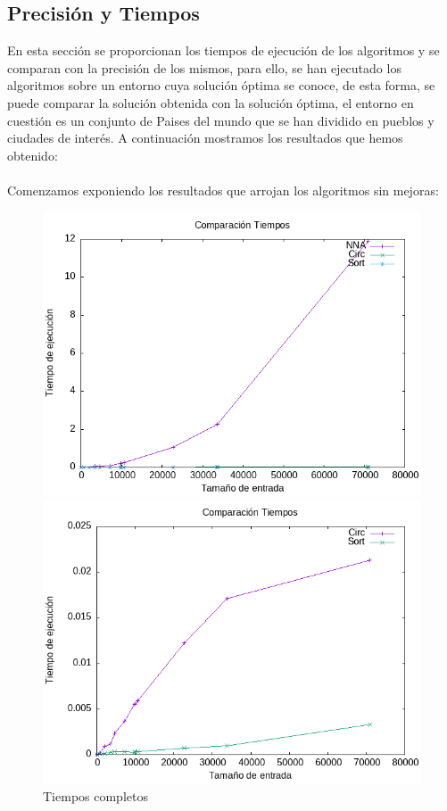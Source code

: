 \documentclass[11pt,openany]{book}
\begin{document}
\subsection{Precisión y Tiempos}
En esta sección se proporcionan los tiempos de ejecución de los algoritmos y se comparan
con la precisión de los mismos, para ello, se han ejecutado los algoritmos sobre un entorno
cuya solución óptima se conoce, de esta forma, se puede comparar la solución obtenida
con la solución óptima, el entorno en cuestión es un conjunto de Paises del mundo
que se han dividido en pueblos y ciudades de interés. A continuación mostramos 
los resultados que hemos obtenido:
\\ \\
Comenzamos exponiendo los resultados que arrojan los algoritmos sin mejoras:
\begin{figure}[H]
      \centering
      \begin{minipage}{.48\textwidth}
            \centering
            \includegraphics[width=1\linewidth]{assets/Img/Tiempos.png}
            \caption{Tiempos completos}
            \label{fig:nearest}
      \end{minipage}%
      \begin{minipage}{.48\textwidth}
            \centering
            \includegraphics[width=1\linewidth]{assets/Img/TiemposCircSort.png}

\end{minipage}
\end{figure}
\end{document}
